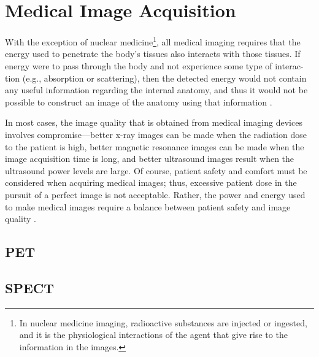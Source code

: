 \chapter{Medical Image Acquisition}

With the exception of nuclear medicine\footnote{In nuclear medicine
  imaging, radioactive substances are injected or ingested, and it is
  the physiological interactions of the agent that give rise to the
  information in the images.}, all medical imaging requires that the
energy used to penetrate the body’s tissues also interacts with those
tissues. If energy were to pass through the body and not experience
some type of interac- tion (e.g., absorption or scattering), then the
detected energy would not contain any useful information regarding the
internal anatomy, and thus it would not be possible to construct an
image of the anatomy using that information
\cite{bushberg2011essential}.

In most cases, the image quality that is obtained from medical
imaging devices involves compromise—better x-ray images can be made when
the radiation dose to the patient is high, better magnetic resonance images can
be made when the image acquisition time is long, and better ultrasound images
result when the ultrasound power levels are large. Of course, patient safety and
comfort must be considered when acquiring medical images; thus, excessive
patient dose in the pursuit of a perfect image is not acceptable. Rather, the power
and energy used to make medical images require a balance between patient safety
and image quality \cite{bushberg2011essential}.

\section{PET}

\section{SPECT}


